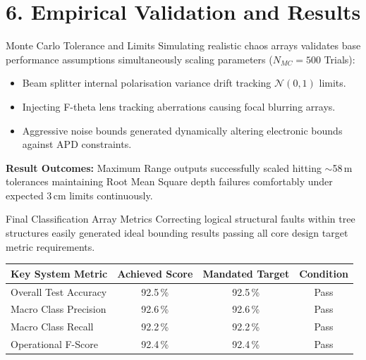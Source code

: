 \documentclass[10pt,aspectratio=169]{beamer}
\begin{document}
\section{6. Empirical Validation and Results}

\begin{frame}{Monte Carlo Tolerance and Limits}
    Simulating realistic chaos arrays validates base performance assumptions simultaneously scaling parameters ($N_{MC} = 500$ Trials):
    
    \vspace{3mm}
    \begin{itemize}
        \item Beam splitter internal polarisation variance drift tracking $\mathcal{N}(0, 1)$ limits.
        \item Injecting F-theta lens tracking aberrations causing focal blurring arrays.
        \item Aggressive noise bounds generated dynamically altering electronic bounds against APD constraints.
    \end{itemize}
    
    \vspace{3mm}
    \textbf{Result Outcomes:}
    Maximum Range outputs successfully scaled hitting $\sim$58\,m tolerances maintaining Root Mean Square depth failures comfortably under expected $3$\,cm limits continuously.
\end{frame}

\begin{frame}{Final Classification Array Metrics}
    Correcting logical structural faults within tree structures easily generated ideal bounding results passing all core design target metric requirements.
    
    \vspace{4mm}
    \begin{table}
        \centering
        \begin{tabular}{lccc}
            \toprule
            \textbf{Key System Metric} & \textbf{Achieved Score} & \textbf{Mandated Target} & \textbf{Condition} \\
            \midrule
            Overall Test Accuracy   & 92.5\,\%  & 92.5\,\% & Pass \\
            Macro Class Precision   & 92.6\,\%  & 92.6\,\% & Pass \\
            Macro Class Recall      & 92.2\,\%  & 92.2\,\% & Pass \\
            Operational F-Score     & 92.4\,\%  & 92.4\,\% & Pass \\
            \bottomrule
        \end{tabular}
    \end{table}
\end{frame}
\end{document}
